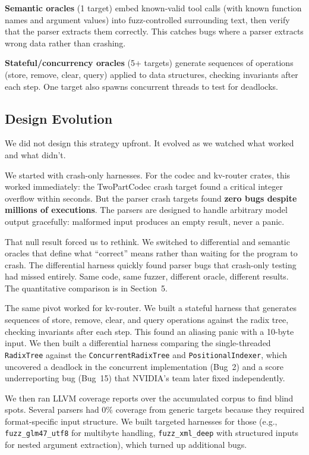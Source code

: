 \documentclass[11pt]{article}
\begin{document}
\textbf{Semantic oracles} (1 target) embed known-valid tool calls (with known function names and argument values) into fuzz-controlled surrounding text, then verify that the parser extracts them correctly. This catches bugs where a parser extracts wrong data rather than crashing.

\textbf{Stateful/concurrency oracles} (5+ targets) generate sequences of operations (store, remove, clear, query) applied to data structures, checking invariants after each step. One target also spawns concurrent threads to test for deadlocks.

\subsection{Design Evolution}

We did not design this strategy upfront. It evolved as we watched what worked and what didn't.

We started with crash-only harnesses. For the codec and kv-router crates, this worked immediately: the TwoPartCodec crash target found a critical integer overflow within seconds. But the parser crash targets found \textbf{zero bugs despite millions of executions}. The parsers are designed to handle arbitrary model output gracefully: malformed input produces an empty result, never a panic.

That null result forced us to rethink. We switched to differential and semantic oracles that define what ``correct'' means rather than waiting for the program to crash. The differential harness quickly found parser bugs that crash-only testing had missed entirely. Same code, same fuzzer, different oracle, different results. The quantitative comparison is in Section~5.

The same pivot worked for kv-router. We built a stateful harness that generates sequences of store, remove, clear, and query operations against the radix tree, checking invariants after each step. This found an aliasing panic with a 10-byte input. We then built a differential harness comparing the single-threaded \texttt{RadixTree} against the \texttt{ConcurrentRadixTree} and \texttt{PositionalIndexer}, which uncovered a deadlock in the concurrent implementation (Bug~2) and a score underreporting bug (Bug~15) that NVIDIA's team later fixed independently.

We then ran LLVM coverage reports over the accumulated corpus to find blind spots. Several parsers had 0\% coverage from generic targets because they required format-specific input structure. We built targeted harnesses for those (e.g., \texttt{fuzz\_glm47\_utf8} for multibyte handling, \texttt{fuzz\_xml\_deep} with structured inputs for nested argument extraction), which turned up additional bugs.
\end{document}
